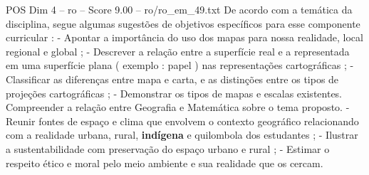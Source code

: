 \begin{textsample}{POS Dim 4 – ro – Score 9.00 – ro/ro\_em\_49.txt}
De acordo com a temática da disciplina, segue algumas sugestões de objetivos específicos para esse componente curricular : - Apontar a importância do uso dos mapas para nossa realidade, local regional e global ; - Descrever a relação entre a superfície real e a representada em uma superfície plana ( exemplo : papel ) nas representações cartográficas ; - Classificar as diferenças entre mapa e carta, e as distinções entre os tipos de projeções cartográficas ; - Demonstrar os tipos de mapas e escalas existentes.
Compreender a relação entre Geografia e Matemática sobre o tema proposto. - Reunir fontes de espaço e clima que envolvem o contexto geográfico relacionando com a realidade urbana, rural, \textbf{indígena} e quilombola dos estudantes ; - Ilustrar a sustentabilidade com preservação do espaço urbano e rural ; - Estimar o respeito ético e moral pelo meio ambiente e sua realidade que os cercam.

\end{textsample}

